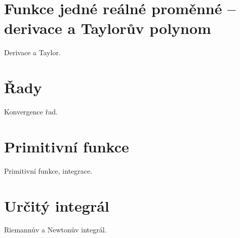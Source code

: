 \documentclass{article}
\theoremstyle{definition}
\begin{document}
\section{Funkce jedné reálné proměnné – derivace a Taylorův polynom}
Derivace a Taylor.

\section{Řady}
Konvergence řad.

\section{Primitivní funkce}
Primitivní funkce, integrace.

\section{Určitý integrál}
Riemannův a Newtonův integrál.

% 
\end{document}
